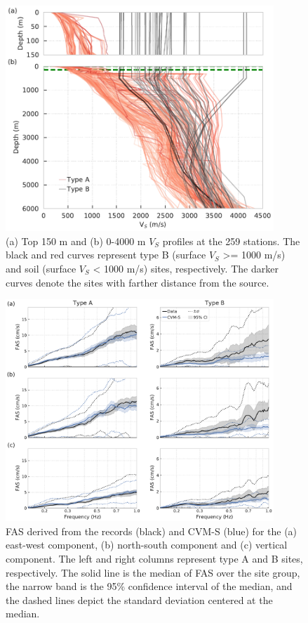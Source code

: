 \clearpage
\begin{figure}[!ht]
  \centering
  \includegraphics[width=0.9\textwidth]{figures/figure_vs30_3.pdf}
  \caption{(a) Top 150 m and (b) 0-4000 m $V_S$ profiles at the 259 stations. The black and red curves represent type B (surface $V_S$ >= 1000 m/s) and soil (surface $V_S$ < 1000 m/s) sites, respectively. The darker curves denote the sites with farther distance from the source.}
  \label{fig:vs30-3}
\end{figure}

\clearpage
\begin{figure}[!ht]
  \centering
  \includegraphics[width=0.9\textwidth]{figures/figure_vs30_4.pdf}
  \caption{FAS derived from the records (black) and CVM-S (blue) for the (a) east-west component, (b) north-south component and (c) vertical component. The left and right columns represent type A and B sites, respectively. The solid line is the median of FAS over the site group, the narrow band is the 95\% confidence interval of the median, and the dashed lines depict the standard deviation centered at the median.
  }
  \label{fig:vs30-4}
\end{figure}

